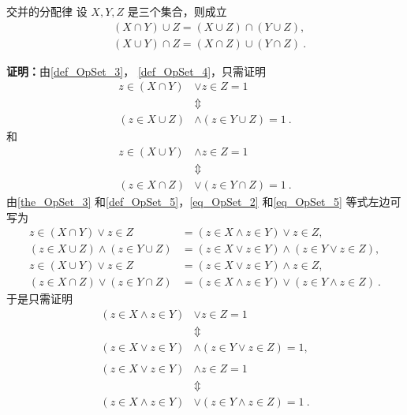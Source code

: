 \begin{theorem}{交并的分配律}
设 $X,Y,Z$ 是三个集合，则成立
\begin{equation}
\begin{aligned}
&(X\cap Y)\cup Z=(X\cup Z)\cap (Y\cup Z),\\
&(X\cup Y)\cap Z=(X\cap Z)\cup (Y\cap Z)~.
\end{aligned}
\end{equation}
\end{theorem}
\textbf{证明：}由\autoref{def_OpSet_3}， \autoref{def_OpSet_4}，只需证明
\begin{equation}\label{eq_OpSet_2}
\begin{aligned}
z\in (X\cap Y)&\lor z\in Z=1\\
&\Updownarrow\\
 (z\in X\cup Z)&\land (z\in Y\cup Z)=1~.
 \end{aligned}
 \end{equation}
 和 
 \begin{equation}\label{eq_OpSet_5}
\begin{aligned}
z\in (X\cup Y)&\land z\in Z=1\\
&\Updownarrow\\
 (z\in X\cap Z)&\lor (z\in Y\cap Z)=1~.
 \end{aligned}
 \end{equation}
由\autoref{the_OpSet_3} 和\autoref{def_OpSet_5}，\autoref{eq_OpSet_2}  和\autoref{eq_OpSet_5} 等式左边可写为
\begin{equation}
\begin{aligned}
z\in (X\cap Y)\lor z\in Z&=(z\in X\land z\in Y)\lor z\in Z,\\
(z\in X\cup Z)\land (z\in Y\cup Z)&=(z\in X\lor z\in Y)\land (z\in Y\lor z\in Z),\\
z\in (X\cup Y)\lor z\in Z&=(z\in X\lor z\in Y)\land z\in Z,\\
(z\in X\cap Z)\lor (z\in Y\cap Z)&=(z\in X\land z\in Y)\lor (z\in Y\land z\in Z)~.
\end{aligned}
\end{equation}
于是只需证明 
\begin{equation}\label{eq_OpSet_8}
\begin{aligned}
(z\in X\land z\in Y)&\lor z\in Z=1\\
&\Updownarrow\\
(z\in X\lor z\in Y)&\land (z\in Y\lor z\in Z)=1,\\
\\
(z\in X\lor z\in Y)&\land z\in Z=1\\
&\Updownarrow\\
(z\in X\land z\in Y)&\lor (z\in Y\land z\in Z)=1~.
\end{aligned}
\end{equation}

